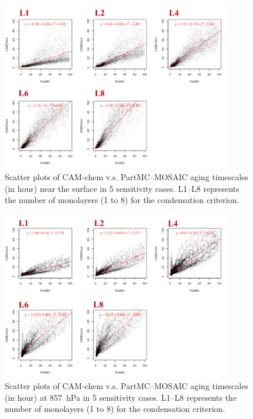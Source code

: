 \documentclass[12pt, fullpage]{uiucthesis2009}
\begin{document}
	\begin{figure}[h] 
		\begin{center}
			\includegraphics[width = 0.9\textwidth]{Figure34}
			\caption[Scatter plots of CAM-chem v.s. PartMC--MOSAIC aging timescales (in hour) near the surface in 5 sensitivity cases. L1--L8 represents the number of monolayers (1 to 8) for the condensation criterion]{\label{fig_p34} Scatter plots of CAM-chem v.s. PartMC--MOSAIC aging timescales (in hour) near the surface in 5 sensitivity cases. L1--L8 represents the number of monolayers (1 to 8) for the condensation criterion.}
		\end{center}
	\end{figure}
	
	
	\begin{figure}[h] 
		\begin{center}
			\includegraphics[width = 0.9\textwidth]{Figure35}
			\caption[Scatter plots of CAM-chem v.s. PartMC--MOSAIC aging timescales (in hour) at 857~hPa in 5 sensitivity cases. L1--L8 represents the number of monolayers (1 to 8) for the condensation criterion]{\label{fig_p35} Scatter plots of CAM-chem v.s. PartMC--MOSAIC aging timescales (in hour) at 857~hPa in 5 sensitivity cases. L1--L8 represents the number of monolayers (1 to 8) for the condensation criterion.}
		\end{center}
	\end{figure}
	
\end{document}
